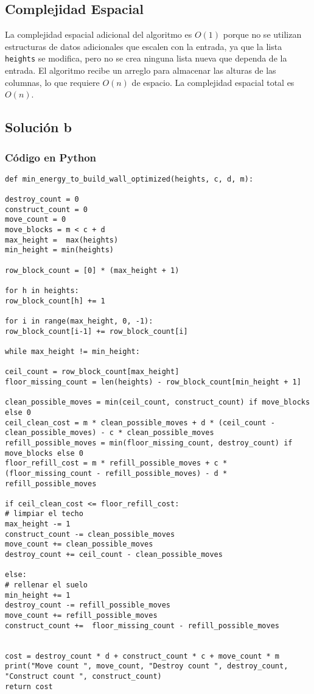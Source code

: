 \documentclass[a4paper,12pt]{article}
\begin{document}
\subsection{Complejidad Espacial}

La complejidad espacial adicional del algoritmo es \( O(1) \) porque no se utilizan estructuras de datos adicionales que escalen con la entrada, ya que la lista \texttt{heights} se modifica, pero no se crea ninguna lista nueva que dependa de la entrada. El algoritmo recibe un arreglo para almacenar las alturas de las columnas, lo que requiere \( O(n) \) de espacio. La complejidad espacial total es \( O(n) \).

\subsection{Solución b}

\subsubsection{Código en Python}
\begin{verbatim}
def min_energy_to_build_wall_optimized(heights, c, d, m):

destroy_count = 0
construct_count = 0
move_count = 0
move_blocks = m < c + d
max_height =  max(heights)
min_height = min(heights)

row_block_count = [0] * (max_height + 1)

for h in heights:
row_block_count[h] += 1

for i in range(max_height, 0, -1):
row_block_count[i-1] += row_block_count[i]

while max_height != min_height:   

ceil_count = row_block_count[max_height]
floor_missing_count = len(heights) - row_block_count[min_height + 1] 

clean_possible_moves = min(ceil_count, construct_count) if move_blocks else 0
ceil_clean_cost = m * clean_possible_moves + d * (ceil_count - clean_possible_moves) - c * clean_possible_moves
refill_possible_moves = min(floor_missing_count, destroy_count) if move_blocks else 0
floor_refill_cost = m * refill_possible_moves + c * (floor_missing_count - refill_possible_moves) - d * refill_possible_moves

if ceil_clean_cost <= floor_refill_cost:
# limpiar el techo
max_height -= 1
construct_count -= clean_possible_moves
move_count += clean_possible_moves
destroy_count += ceil_count - clean_possible_moves

else: 
# rellenar el suelo
min_height += 1
destroy_count -= refill_possible_moves
move_count += refill_possible_moves
construct_count +=  floor_missing_count - refill_possible_moves


cost = destroy_count * d + construct_count * c + move_count * m
print("Move count ", move_count, "Destroy count ", destroy_count, "Construct count ", construct_count)
return cost
\end{verbatim}
\end{document}
